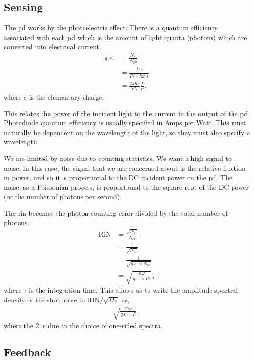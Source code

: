 \subsection{Sensing}

The \ac{pd} works by the photoelectric effect. There is a quantum
efficiency associated with each \ac{pd} which is the amount of light quanta
(photons) which are converted into electrical current.
\begin{align}
q.e. &= \frac{N_{el}}{N_{ph}} \\
     &= \frac{I/e}{P/(\hbar \omega)} \\
     &= \frac{2 \pi \hbar c}{e \lambda} \frac{I}{P} ,
\end{align}
where $e$ is the elementary charge.

This relates the
power of the incident light to the current in the output of the \ac{pd}.
Photodiode quantum efficiency is usually specified in Amps per Watt.
This must naturally be dependent on the wavelength of the light, so they must
also specify a wavelength.

We are limited by noise due to counting statistics. We want a high signal
to noise. In this case, the signal that we are concerned about is the
relative fluction in power, and so it is proportional to the DC incident
power on the \ac{pd}. The noise, as a Poissonian process, is proportional
to the square root of the DC power (or the number of photons per second).

The \ac{rin} becomes the photon counting error divided by the total number
of photons.
\begin{align}
\mathrm{RIN} &= \frac{\sqrt{N_{el}}}{N_{el}} \\
     &= \frac{1}{\sqrt{N_{el}}} \\
     &= \frac{1}{\sqrt{q.e. \times N_{ph}}} \\
     &= \sqrt{\frac{\hbar \omega}{q.e. \times P \tau}} \, ,
\end{align}
where $\tau$ is the integration time. This allows us to write the amplitude
spectral density of the shot noise in $\mathrm{RIN} / \sqrt{H\!z}$ as,
\begin{align}
\sqrt{\frac{2 \hbar \omega}{q.e. \times P}} \, ,
\end{align}
where the 2 is due to the choice of one-sided spectra.

\subsection{Feedback}


